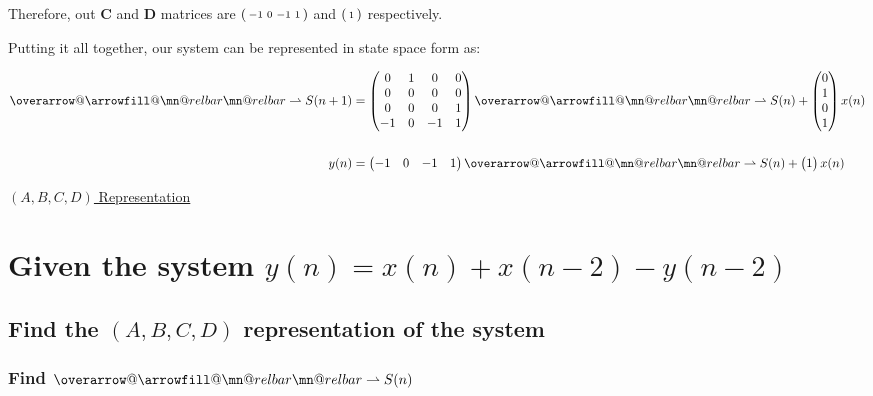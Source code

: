 \documentclass{article}
\makeatletter
\newenvironment{directsubsubs}{
  \makeatletter
  \renewcommand\thesubsubsection{\thesection.\Roman{subsubsection}}
  \makeatother
}{
  \makeatletter
  \renewcommand\thesubsubsection{\thesubsection.\Roman{subsubsection}}
  \makeatother
}
\renewcommand{\thesubsection}{\thesection.\alph{subsection}}
\renewcommand{\thesubsubsection}{\thesection.\alph{subsection}.\Roman{subsubsection}}
\DeclareRobustCommand{\overrightharpoon}{\mathpalette{\overarrow@\rightharpoonfill@}}
\def\rightharpoonfill@{\arrowfill@\mn@relbar\mn@relbar\rightharpoonup}
\makeatother
\begin{document}
\begin{directsubsubs}
	Therefore, out $\boldsymbol{C}$ and $\boldsymbol{D}$ matrices are $\begin{psmallmatrix} -1 & 0 & -1 & 1 \end{psmallmatrix}$ and $\begin{psmallmatrix} 1 \end{psmallmatrix}$ respectively.

	Putting it all together, our system can be represented in state space form as:
	
	\begin{align*}
		\overrightharpoon{S(n + 1)} &= \begin{pmatrix} 0 & 1 & 0 & 0 \\ 0 & 0 & 0 & 0 \\ 0 & 0 & 0 & 1 \\ -1 & 0 & -1 & 1 \end{pmatrix}\overrightharpoon{S(n )} + \begin{pmatrix} 0 \\ 1 \\ 0 \\ 1 \end{pmatrix}x(n) \\\\
		y(n) &= \begin{pmatrix} -1 & 0 & -1 & 1 \end{pmatrix}\overrightharpoon{S(n)} + \begin{pmatrix} 1 \end{pmatrix}x(n)
	\end{align*}

\end{directsubsubs}

\newpage

\begin{center}
	\Large{\underline{$(A, B, C, D)$ Representation}}
\end{center}

\section[Question ~\thesection]{Given the system $y(n) = x(n) + x(n - 2) - y(n - 2)$}

\subsection[~\thesubsection]{Find the $(A, B, C, D)$ representation of the system}

\subsubsection[~\thesubsubsection]{Find $\overrightharpoon{S(n)}$}
\end{document}

